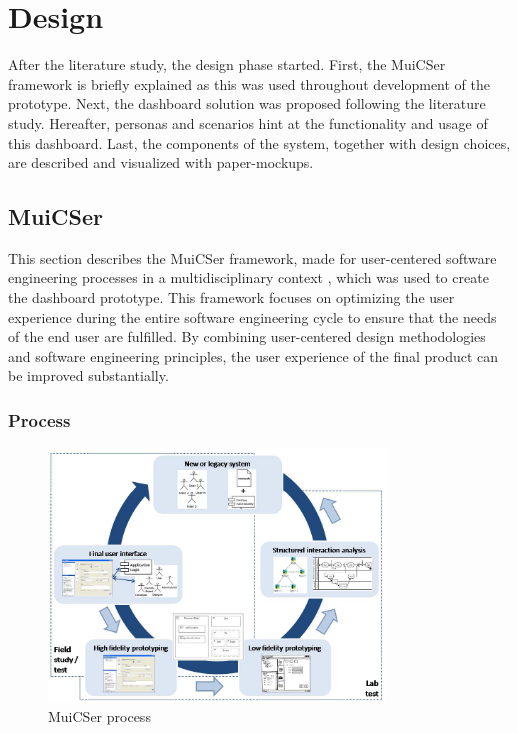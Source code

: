 \section{Design} \label{design}

After the literature study, the design phase started. First, the MuiCSer framework is briefly explained as this was used throughout development of the prototype. Next, the dashboard solution was proposed following the literature study. Hereafter, personas and scenarios hint at the functionality and usage of this dashboard. Last, the components of the system, together with design choices, are described and visualized with paper-mockups.

    \subsection{MuiCSer} \label{2_muicser}
    This section describes the MuiCSer framework, made for user-centered software engineering processes in a multidisciplinary context \cite{muicser}, which was used to create the dashboard prototype. This framework focuses on optimizing the user experience during the entire software engineering cycle to ensure that the needs of the end user are fulfilled. By combining user-centered design methodologies and software engineering principles, the user experience of the final product can be improved substantially.

        \subsubsection{Process}
        
        \begin{figure}[!t]
            \centering
            \includegraphics[width=0.8\textwidth]{chapters/3_design/muicser}
            \caption{MuiCSer process}\label{fig:muicser}
        \end{figure}

